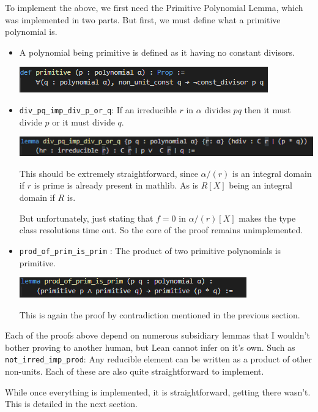 \documentclass[pagesize=a4]{scrreprt}
\begin{document}
To implement the above, we first need the Primitive Polynomial Lemma, which was implemented in two parts. But first, we must define what a primitive polynomial is.  

\begin{itemize}
   \item A polynomial being primitive is defined as it having no constant divisors. 

   \includegraphics{def_prim.png}

   \item \texttt{div\_pq\_imp\_div\_p\_or\_q}: If an irreducible $r$ in $\alpha$ divides $pq$ then it must divide $p$ or it must divide $q$. 

    \includegraphics{div_pq.png}

    This should be extremely straightforward, since $\alpha/(r)$ is an integral domain if $r$ is prime is already present in mathlib. As is $R[X]$ being an integral domain if $R$ is.

    But unfortunately, just stating that $f = 0$ in $\alpha/(r)[X]$ makes the type class resolutions time out. So the core of the proof remains unimplemented.

    \item \texttt{prod\_of\_prim\_is\_prim} : The product of two primitive polynomials is primitive. 
    
    \includegraphics{prod_prim.png} 

    This is again the proof by contradiction mentioned in the previous section. 

\end{itemize}


Each of the proofs above depend on numerous subsidiary lemmas that I wouldn't bother proving to another human, but Lean cannot infer on it's own. Such as \texttt{not\_irred\_imp\_prod}: Any reducible element can be written as a product of other non-units. Each of these are also quite straightforward to implement. 

While once everything is implemented, it is straightforward, getting there wasn't.  This is detailed in the next section. 
\end{document}
